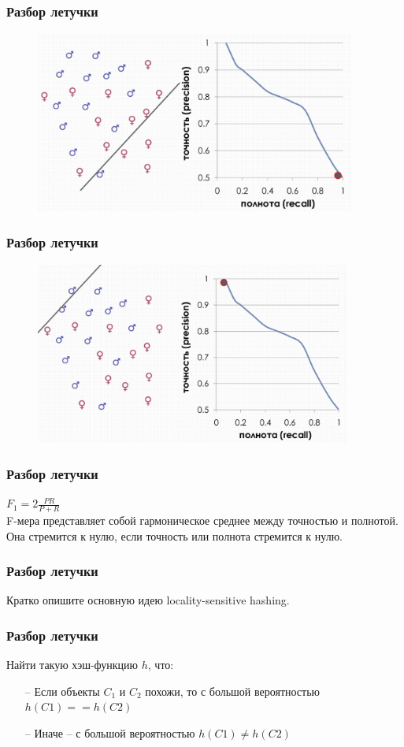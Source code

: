 \documentclass[12pt]{beamer}
\begin{document}
\begin{frame}\frametitle{Разбор летучки}
\begin{figure}[htbp]
\centering
\includegraphics[height=170pt]{images/precision-recall-2}  
\end{figure}
\end{frame}

\begin{frame}\frametitle{Разбор летучки}
\begin{figure}[htbp]
\centering
\includegraphics[height=170pt]{images/precision-recall-3}  
\end{figure}
\end{frame}

\begin{frame}\frametitle{Разбор летучки}
$F_1 = 2 \frac{P R}{P + R}$\\
\vspace{5mm}
F-мера представляет собой гармоническое среднее между точностью и полнотой. Она стремится к нулю, если точность или полнота стремится к нулю.
\end{frame}

\begin{frame}\frametitle{Разбор летучки}
Кратко опишите основную идею locality-sensitive hashing.
\end{frame}

\begin{frame}\frametitle{Разбор летучки}
Найти такую хэш-функцию $h$, что:\\
\begin{itemize}
\item[--] Если объекты $C_1$ и $C_2$ похожи, то с большой вероятностью $h(C1) == h(C2)$\\
\item[--] Иначе -- с большой вероятностью $h(C1) \neq h(C2)$
\end{itemize}
\end{frame}
\end{document}

